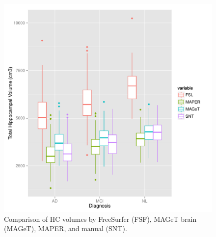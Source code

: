 \documentclass{article}\usepackage{graphicx, color}
\makeatletter
\def\maxwidth{ %
  \ifdim\Gin@nat@width>\linewidth
    \linewidth
  \else
    \Gin@nat@width
  \fi
}
\newenvironment{knitrout}{}{} %
\newcommand{\marginnote}[1]{\-\marginpar[\raggedleft\footnotesize #1]{\raggedright\footnotesize #1}}
\newcommand{\todo}[1]{\marginnote{\textcolor{red}{TODO #1}}}
\makeatother
\begin{document}
\todo{Kappa against our manual rater is low}




\begin{figure}[h]
\begin{knitrout}
\color{fgcolor}

{\centering \includegraphics[width=\maxwidth]{figure/ADNI-baseline-volumes-boxplot} 

}


\end{knitrout}

  \caption{Comparison of HC volumes by FreeSurfer (FSF), MAGeT brain (MAGeT), MAPER, and manual (SNT).}
  \label{ADNI-baseline-volumes-boxplot}
\end{figure}
\end{document}

